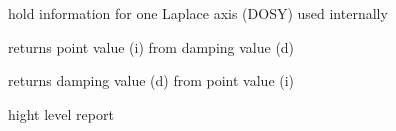 \documentclass[letterpaper,10pt,openany,oneside]{sphinxmanual}
\begin{document}
\begin{fulllineitems}
\label{rst/code:NPKData.LaplaceAxis}
hold information for one Laplace axis (DOSY)
used internally

\begin{fulllineitems}
\label{rst/code:NPKData.LaplaceAxis.dtoi}
returns point value (i) from damping value (d)

\end{fulllineitems}


\begin{fulllineitems}
\label{rst/code:NPKData.LaplaceAxis.itod}
returns damping value (d) from point value (i)

\end{fulllineitems}


\begin{fulllineitems}
\label{rst/code:NPKData.LaplaceAxis.report}
hight level report

\end{fulllineitems}


\end{fulllineitems}

\end{document}
